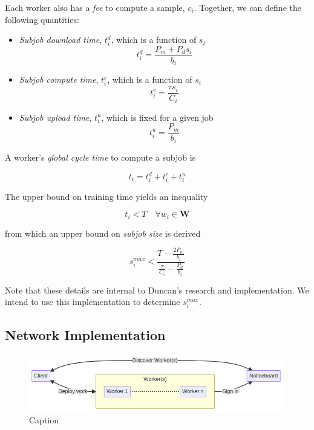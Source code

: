 \documentclass[../mthe-493-final-project.tex]{subfiles}
\begin{document}
    Each worker also has a \textit{fee} to compute a sample, $c_i$. Together, we can define the following quantities:

    \begin{itemize}
        \item \textit{Subjob download time}, $t^d_i$, which is a function of $s_i$
              \[t^d_i = \frac{P_m + P_d s_i}{b_i}\]
        \item \textit{Subjob compute time}, $t^c_i$, which is a function of $s_i$
              \[t^c_i = \frac{\tau s_i}{C_i}\]
        \item \textit{Subjob upload time}, $t^u_i$, which is fixed for a given job
              \[t^u_i = \frac{P_m}{b_i}\]
    \end{itemize}

    A worker's \textit{global cycle time} to compute a subjob is

    \[t_i = t^d_i + t^c_i + t^u_i\]

    The upper bound on training time yields an inequality

    \[t_i < T \quad \forall w_i \in \mathbf{W}\]

    from which an upper bound on \textit{subjob size} is derived

    \[s^{max}_i < \frac{T - \frac{2 P_m}{b_i}}{\frac{\tau}{C_i} - \frac{P_d}{b_i}}\]

    Note that these details are internal to Duncan's research and implementation. We intend to use this implementation to determine $s^{max}_i$.
    

    \subsection{Network Implementation}
    \label{ssec:network-implementation}

    
    
    \begin{figure}
        \centering
        \includegraphics{thesis/img/network-1.png}
        \caption{Caption}
        \label{fig:network-flowchart}
    \end{figure}
\end{document}
